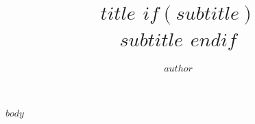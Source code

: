 \documentclass[novel]{sffms}
\author{$author$}
\title{$title$
$if(subtitle)$
\\$subtitle$
$endif$
}
\begin{document}
$body$
\end{document}
